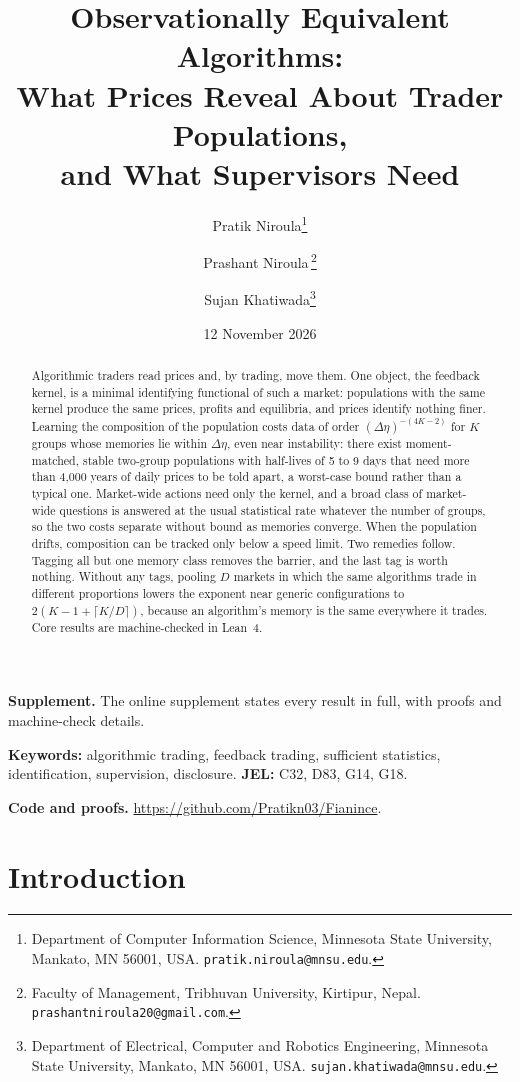 \documentclass[12pt]{article}
\title{Observationally Equivalent Algorithms:\\ What Prices Reveal About Trader Populations,\\ and What Supervisors Need}
\author{Pratik Niroula\thanks{Department of Computer Information Science, Minnesota State University, Mankato, MN 56001, USA. \texttt{pratik.niroula@mnsu.edu}.}
\and Prashant Niroula\,\thanks{Faculty of Management, Tribhuvan University, Kirtipur, Nepal. \texttt{prashantniroula20@gmail.com}.}
\and Sujan Khatiwada\thanks{Department of Electrical, Computer and Robotics Engineering, Minnesota State University, Mankato, MN 56001, USA. \texttt{sujan.khatiwada@mnsu.edu}.}}
\date{12 November 2026}
\theoremstyle{definition}
\theoremstyle{remark}
\begin{document}
\maketitle
\thispagestyle{empty}\pagestyle{empty}
\begingroup\onehalfspacing

\begin{abstract}
\noindent Algorithmic traders read prices and, by trading, move them. One object, the feedback kernel, is a minimal identifying functional of such a market: populations with the same kernel produce the same prices, profits and equilibria, and prices identify nothing finer. Learning the composition of the population costs data of order $(\Delta\eta)^{-(4K-2)}$ for $K$ groups whose memories lie within $\Delta\eta$, even near instability: there exist moment-matched, stable two-group populations with half-lives of 5 to 9 days that need more than 4{,}000 years of daily prices to be told apart, a worst-case bound rather than a typical one. Market-wide actions need only the kernel, and a broad class of market-wide questions is answered at the usual statistical rate whatever the number of groups, so the two costs separate without bound as memories converge. When the population drifts, composition can be tracked only below a speed limit. Two remedies follow. Tagging all but one memory class removes the barrier, and the last tag is worth nothing. Without any tags, pooling $D$ markets in which the same algorithms trade in different proportions lowers the exponent near generic configurations to $2(K-1+\lceil K/D\rceil)$, because an algorithm's memory is the same everywhere it trades. Core results are machine-checked in Lean~4.
\end{abstract}

\noindent\textbf{Supplement.} The online supplement states every result in full, with proofs and machine-check details.

\noindent\textbf{Keywords:} algorithmic trading, feedback trading, sufficient statistics, identification, supervision, disclosure. \textbf{JEL:} C32, D83, G14, G18.

\noindent\textbf{Code and proofs.} \url{https://github.com/Pratikn03/Fianince}.

\endgroup
\newpage
\pagestyle{fancy}
\setcounter{page}{1}

\section{Introduction}\label{n:intro}
\end{document}
